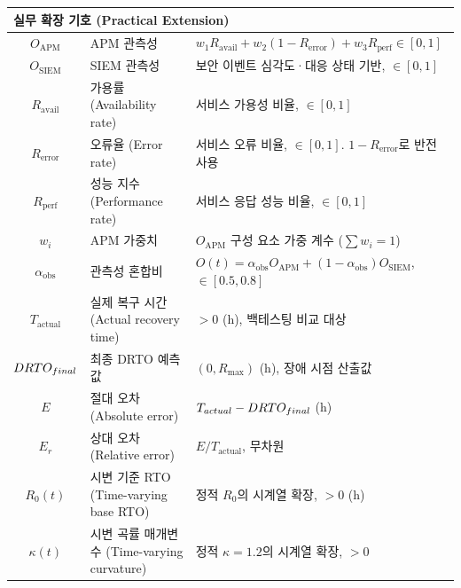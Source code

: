 \begin{longtable}{c >{\raggedright\arraybackslash}p{4.8cm} >{\raggedright\arraybackslash}p{8.5cm}}
\multicolumn{3}{l}{\textbf{실무 확장 기호 (Practical Extension)}} \\
\midrule
$O_{\mathrm{APM}}$  & APM 관측성              & $w_1 R_{\mathrm{avail}} + w_2 (1-R_{\mathrm{error}}) + w_3 R_{\mathrm{perf}} \in [0,1]$ \\
$O_{\mathrm{SIEM}}$ & SIEM 관측성             & 보안 이벤트 심각도·대응 상태 기반, $\in [0,1]$ \\
$R_{\mathrm{avail}}$ & 가용률 (Availability rate) & 서비스 가용성 비율, $\in [0,1]$ \\
$R_{\mathrm{error}}$ & 오류율 (Error rate)     & 서비스 오류 비율, $\in [0,1]$. $1-R_{\mathrm{error}}$로 반전 사용 \\
$R_{\mathrm{perf}}$  & 성능 지수 (Performance rate) & 서비스 응답 성능 비율, $\in [0,1]$ \\
$w_i$               & APM 가중치              & $O_{\mathrm{APM}}$ 구성 요소 가중 계수 ($\sum w_i = 1$) \\
$\alpha_{\mathrm{obs}}$ & 관측성 혼합비        & $O(t) = \alpha_{\mathrm{obs}} O_{\mathrm{APM}} + (1-\alpha_{\mathrm{obs}}) O_{\mathrm{SIEM}}$, $\in [0.5, 0.8]$ \\
$T_{\mathrm{actual}}$   & 실제 복구 시간 (Actual recovery time) & $> 0$ (h), 백테스팅 비교 대상 \\
$DRTO_{final}$ & 최종 DRTO 예측값      & $(0, R_{\max})$ (h), 장애 시점 산출값 \\
$E$                     & 절대 오차 (Absolute error) & $T_{actual} - DRTO_{final}$ (h) \\
$E_r$                   & 상대 오차 (Relative error) & $E / T_{\mathrm{actual}}$, 무차원 \\
$R_0(t)$                & 시변 기준 RTO (Time-varying base RTO) & 정적 $R_0$의 시계열 확장, $> 0$ (h) \\
$\kappa(t)$             & 시변 곡률 매개변수 (Time-varying curvature) & 정적 $\kappa = 1.2$의 시계열 확장, $> 0$ \\

\bottomrule
\end{longtable}


\label{app:key-formulas}

